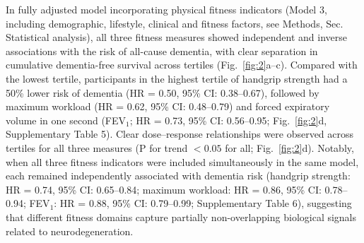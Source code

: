 \documentclass{article}
\begin{document}
In fully adjusted model incorporating physical fitness indicators (Model 3, including demographic, lifestyle, clinical and fitness factors, see Methods, Sec. Statistical analysis), all three fitness measures showed independent and 
inverse associations with the risk of all-cause dementia, with clear separation 
in cumulative dementia-free survival across tertiles (Fig.~\ref{fig:2}a--c).
Compared with the lowest tertile, participants in the highest tertile of handgrip 
strength had a 50\% lower risk of dementia (HR = 0.50, 95\% CI: 0.38--0.67), 
followed by maximum workload (HR = 0.62, 95\% CI: 0.48--0.79) 
and forced expiratory volume in one second (FEV$_1$; HR = 0.73, 95\% CI: 0.56--0.95; 
Fig.~\ref{fig:2}d, Supplementary Table 5).
Clear dose--response relationships were observed across tertiles for all three 
measures (P for trend $< 0.05$ for all; Fig.~\ref{fig:2}d).
Notably, when all three fitness indicators were included simultaneously in the 
same model, each remained independently associated with dementia risk (handgrip 
strength: HR = 0.74, 95\% CI: 0.65--0.84; maximum workload: 
HR = 0.86, 95\% CI: 0.78--0.94; FEV$_1$: HR = 0.88, 95\% CI: 0.79--0.99; Supplementary Table 6), 
suggesting that different fitness domains capture partially non-overlapping 
biological signals related to neurodegeneration.
\end{document}
